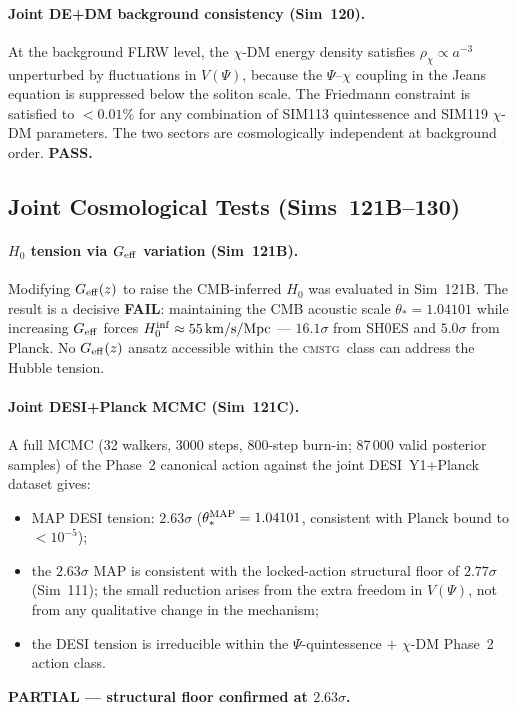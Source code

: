 \documentclass[12pt,a4paper]{article}
\newcommand{\CMSTG}{\textsc{cmstg}}
\begin{document}
\paragraph{Joint DE+DM background consistency (Sim~120).}
At the background FLRW level, the $\chi$-DM energy density satisfies
$\rho_\chi\propto a^{-3}$ unperturbed by fluctuations in $V(\Psi)$, because
the $\Psi$--$\chi$ coupling in the Jeans equation is suppressed below the
soliton scale.  The Friedmann constraint is satisfied to $<0.01\%$ for any
combination of SIM113 quintessence and SIM119 $\chi$-DM parameters.  The two
sectors are cosmologically independent at background order.  \textbf{PASS.}

\subsection{Joint Cosmological Tests (Sims~121B--130)}

\paragraph{$H_0$ tension via $G_{\rm eff}$ variation (Sim~121B).}
Modifying $G_{\rm eff}(z)$ to raise the CMB-inferred $H_0$ was evaluated in
Sim~121B.  The result is a decisive \textbf{FAIL}: maintaining the CMB acoustic
scale $\theta_*=1.04101$ while increasing $G_{\rm eff}$ forces
$H_0^{\rm inf}\approx55\,\mathrm{km/s/Mpc}$ --- $16.1\sigma$ from SH0ES and
$5.0\sigma$ from Planck.  No $G_{\rm eff}(z)$ ansatz accessible within the
\CMSTG\ class can address the Hubble tension.

\paragraph{Joint DESI+Planck MCMC (Sim~121C).}
A full MCMC (32 walkers, 3000 steps, 800-step burn-in; 87\,000 valid posterior
samples) of the Phase~2 canonical action against the joint DESI~Y1+Planck dataset
gives:
\begin{itemize}
  \item MAP DESI tension: $2.63\sigma$
    ($\theta_*^{\rm MAP}=1.04101$, consistent with Planck bound to $<10^{-5}$);
  \item the $2.63\sigma$ MAP is consistent with the locked-action structural
    floor of $2.77\sigma$ (Sim~111); the small reduction arises from the extra
    freedom in $V(\Psi)$, not from any qualitative change in the mechanism;
  \item the DESI tension is irreducible within the $\Psi$-quintessence $+$
    $\chi$-DM Phase~2 action class.
\end{itemize}
\textbf{PARTIAL --- structural floor confirmed at $2.63\sigma$.}
\end{document}
